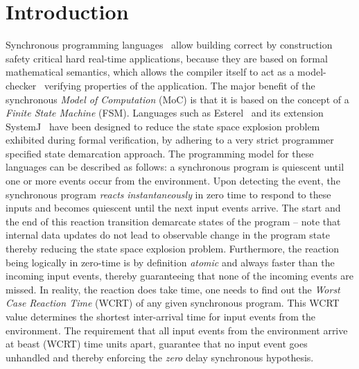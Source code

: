 \section{Introduction}
\label{sec:introduction}

Synchronous programming languages~\cite{berry92} allow building correct
by construction safety critical hard real-time applications, because
they are based on formal mathematical semantics, which allows the
compiler itself to act as a model-checker~\cite{jagadeesan1995safety}
verifying properties of the application. The major benefit of the
synchronous \textit{Model of Computation} (MoC) is that it is based on
the concept of a \textit{Finite State Machine} (FSM). Languages such as
Esterel~\cite{berry92} and its extension SystemJ~\cite{amal10} have been
designed to reduce the state space explosion problem exhibited during
formal verification, by adhering to a very strict programmer specified
state demarcation approach. The programming model for these languages
can be described as follows: a synchronous program is quiescent until
one or more events occur from the environment. Upon detecting the event,
the synchronous program \textit{reacts} \textit{instantaneously} in zero
time to respond to these inputs and becomes quiescent until the next
input events arrive. The start and the end of this reaction transition
demarcate states of the program -- note that internal data updates do
not lead to {\color{red} observable} change in the program state thereby
reducing the state space explosion problem. Furthermore, the reaction
being logically in zero-time is by definition \textit{atomic} and always
faster than the incoming input events, thereby guaranteeing that none of
the incoming events are missed. In reality, the reaction does take time,
one needs to find out the \textit{Worst Case Reaction Time} (WCRT) of
any given synchronous program. This WCRT value determines the shortest
inter-arrival time for input events from the environment. {\color{red}
  The requirement that all input events from the environment arrive at
  beast (WCRT) time units apart, guarantee that no input event goes
  unhandled and thereby enforcing the \textit{zero} delay synchronous
  hypothesis.}

